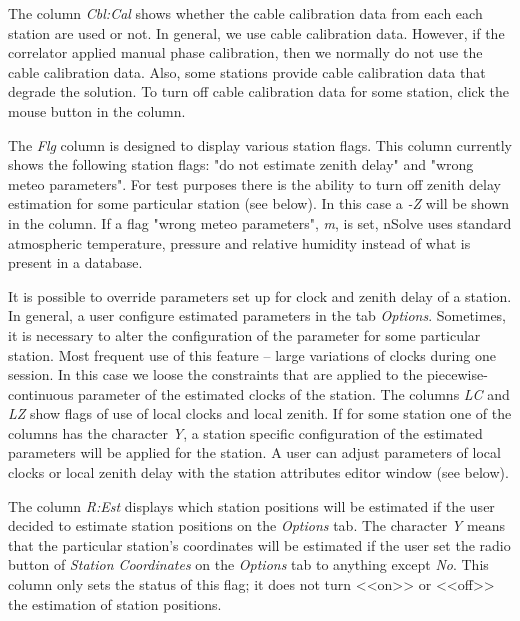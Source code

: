 \documentclass [10pt,letterpaper]{report}
\newcommand{\nuSolve}{\greektext n\latintext Solve}
\begin{document}
The column {\sl Cbl:Cal} shows whether the cable calibration data
from each each station are used or not. In general, we use cable
calibration data. However, if the correlator applied manual phase
calibration, then we normally do not use the cable calibration data.
Also, some stations provide cable calibration data that degrade the
solution. To turn off cable calibration data for some station, click
the mouse button in the column.

The {\sl Flg} column is designed to display various station flags. This
column currently shows the following station flags: "do not
estimate zenith delay" and "wrong meteo parameters".
For test purposes there is the ability to turn off
zenith delay estimation for some particular station (see below). In this case a
{\sl -Z} will be shown in the column. If a flag "wrong meteo parameters", {\sl m},
is set, \nuSolve{} uses standard atmospheric temperature, pressure and
relative humidity instead of what is present in a database.


It is possible to override parameters set up for clock and zenith delay
of a station. In general, a user configure estimated parameters in the
tab {\sl Options}. Sometimes, it is necessary to alter the
configuration of the parameter for some particular station. Most
frequent use of this feature -- large variations of clocks during one
session. In this case we loose the constraints that are applied to
the piecewise-continuous parameter of the estimated clocks of the station.
The columns {\sl LC} and {\sl LZ} show flags of use of local clocks
and local zenith. If for some station one of
the columns has the character {\sl Y}, a station specific configuration
of the estimated parameters will be applied for the station. A user can
adjust parameters of local clocks or local zenith delay with the station
attributes editor window (see below).

The column {\sl R:Est} displays which station positions will
be estimated if the user decided to estimate station positions on the
{\sl Options} tab. The character {\sl Y} means that the particular
station's coordinates will be estimated if the user set the radio button
of {\sl Station Coordinates} on the {\sl Options} tab to anything
except {\sl No}. This column only sets the status of this flag; it
does not turn <<on>> or <<off>> the estimation of station positions.
\end{document}
